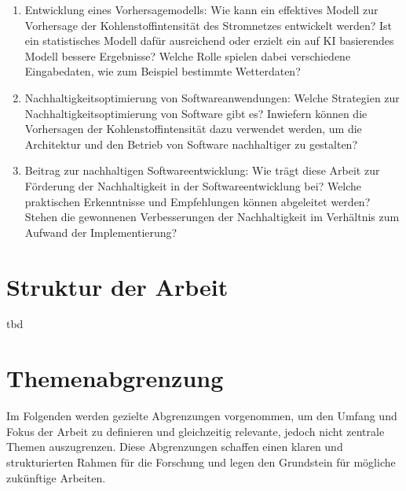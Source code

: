 \begin{enumerate}
 \item Entwicklung eines Vorhersagemodells: Wie kann ein effektives Modell zur Vorhersage der Kohlenstoffintensität des Stromnetzes entwickelt werden?
 Ist ein statistisches Modell dafür ausreichend oder erzielt ein auf \ac{KI} basierendes Modell bessere Ergebnisse?
 Welche Rolle spielen dabei verschiedene Eingabedaten, wie zum Beispiel bestimmte Wetterdaten?
 \item Nachhaltigkeitsoptimierung von Softwareanwendungen: Welche Strategien zur Nachhaltigkeitsoptimierung von Software gibt es?
 Inwiefern können die Vorhersagen der Kohlenstoffintensität dazu verwendet werden, um die Architektur und den Betrieb von Software nachhaltiger zu gestalten?
 \item Beitrag zur nachhaltigen Softwareentwicklung: Wie trägt diese Arbeit zur Förderung der Nachhaltigkeit in der Softwareentwicklung bei?
 Welche praktischen Erkenntnisse und Empfehlungen können abgeleitet werden?
 Stehen die gewonnenen Verbesserungen der Nachhaltigkeit im Verhältnis zum Aufwand der Implementierung?
\end{enumerate}
%
\section{Struktur der Arbeit}
tbd
\section{Themenabgrenzung}
Im Folgenden werden gezielte Abgrenzungen vorgenommen, um den Umfang und Fokus der Arbeit zu definieren und gleichzeitig relevante, jedoch nicht zentrale Themen auszugrenzen.
Diese Abgrenzungen schaffen einen klaren und strukturierten Rahmen für die Forschung und legen den Grundstein für mögliche zukünftige Arbeiten.


